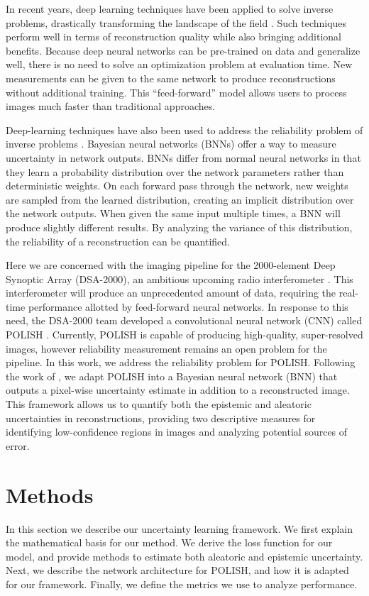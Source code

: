 \documentclass{article}
\begin{document}
In recent years, deep learning techniques have been applied to solve inverse problems, drastically transforming the landscape of the field \cite{ongie2020deep}. Such techniques perform well in terms of reconstruction quality while also bringing additional benefits. Because deep neural networks can be pre-trained on data and generalize well, there is no need to solve an optimization problem at evaluation time. New measurements can be given to the same network to produce reconstructions without additional training. This ``feed-forward'' model allows users to process images much faster than traditional approaches. 

Deep-learning techniques have also been used to address the reliability problem of inverse problems \cite{sun2020deep}. Bayesian neural networks (BNNs) offer a way to measure uncertainty in network outputs. BNNs differ from normal neural networks in that they learn a probability distribution over the network parameters rather than deterministic weights. On each forward pass through the network, new weights are sampled from the learned distribution, creating an implicit distribution over the network outputs. When given the same input multiple times, a BNN will produce slightly different results. By analyzing the variance of this distribution, the reliability of a reconstruction can be quantified.

Here we are concerned with the imaging pipeline for the 2000-element Deep Synoptic Array (DSA-2000), an ambitious upcoming radio interferometer \cite{hallinan2019dsa2000}. This interferometer will produce an unprecedented amount of data, requiring the real-time performance allotted by feed-forward neural networks. In response to this need, the DSA-2000 team developed a convolutional neural network (CNN) called POLISH \cite{connor2021deep}. Currently, POLISH is capable of producing high-quality, super-resolved images, however reliability measurement remains an open problem for the pipeline. In this work, we address the reliability problem for POLISH. Following the work of \citet{Xue:19}, we adapt POLISH into a Bayesian neural network (BNN) that outputs a pixel-wise uncertainty estimate in addition to a reconstructed image. This framework allows us to quantify both the epistemic and aleatoric uncertainties in reconstructions, providing two descriptive measures for identifying low-confidence regions in images and analyzing potential sources of error.

\section{Methods}
In this section we describe our uncertainty learning framework. We first explain the mathematical basis for our method. We derive the loss function for our model, and provide methods to estimate both aleatoric and epistemic uncertainty. Next, we describe the network architecture for POLISH, and how it is adapted for our framework. Finally, we define the metrics we use to analyze performance.
\end{document}
